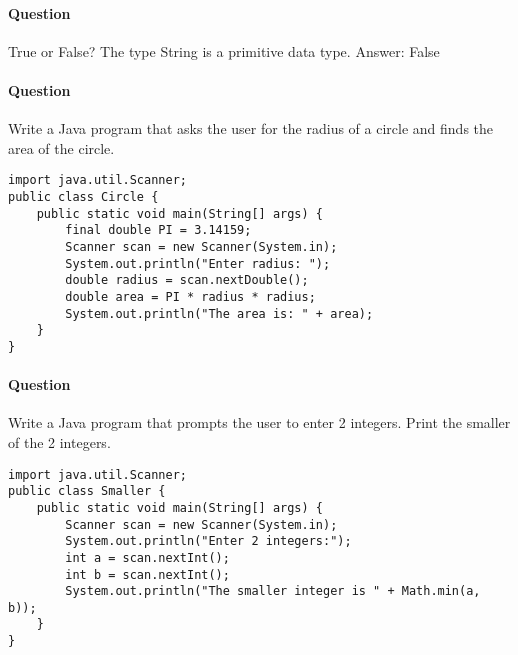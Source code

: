 \documentclass{article}
\begin{document}
\paragraph{Question }
True or False? The type String is a primitive data type.
{\color{red}Answer: False}

\addtocounter{question_num}{1}
\paragraph{Question }
Write a Java program that asks the user for the radius of a circle and finds the area of the circle.
\begin{lstlisting}
import java.util.Scanner;
public class Circle {
	public static void main(String[] args) {
		final double PI = 3.14159;
		Scanner scan = new Scanner(System.in);
		System.out.println("Enter radius: ");
		double radius = scan.nextDouble();
		double area = PI * radius * radius;
		System.out.println("The area is: " + area);
	}
}
\end{lstlisting}

\addtocounter{question_num}{1}
\paragraph{Question }
Write a Java program that prompts the user to enter 2 integers. Print the smaller of the 2 integers.
\begin{lstlisting}
import java.util.Scanner;
public class Smaller {
	public static void main(String[] args) {
		Scanner scan = new Scanner(System.in);
		System.out.println("Enter 2 integers:");
		int a = scan.nextInt();
		int b = scan.nextInt();
		System.out.println("The smaller integer is " + Math.min(a, b));
	}
}
\end{lstlisting}
\end{document}
